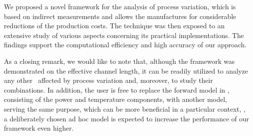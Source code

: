 We proposed a novel framework for the analysis of process variation, which is based on indirect measurements and allows the manufactures for considerable reductions of the production costs. The technique was then exposed to an extensive study of various aspects concerning its practical implementations. The findings support the computational efficiency and high accuracy of our approach.

As a closing remark, we would like to note that, although the framework was demonstrated on the effective channel length, it can be readily utilized to analyze any other \qois\ affected by process variation and, moreover, to study their combinations. In addition, the user is free to replace the forward model in , consisting of the power and temperature components, with another model, serving the same purpose, which can be more beneficial in a particular context, \eg, a deliberately chosen ad hoc model is expected to increase the performance of our framework even higher.
